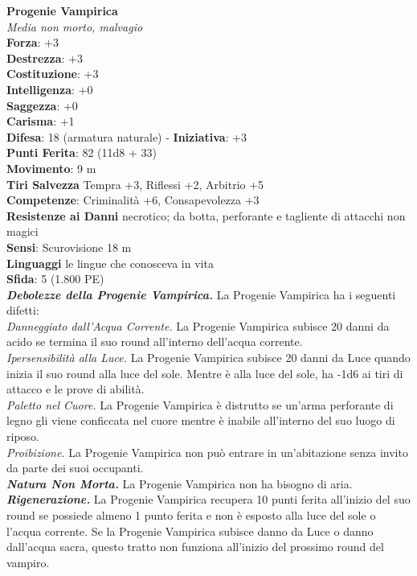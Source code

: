 \begin{multicols}{2}
\medskip\textbf{Progenie Vampirica}\\
\emph{Media non morto, malvagio}\\
\textbf{Forza}: +3\\
\textbf{Destrezza}: +3\\
\textbf{Costituzione}: +3\\
\textbf{Intelligenza}: +0\\
\textbf{Saggezza}: +0\\
\textbf{Carisma}: +1\\
\textbf{Difesa}: 18 (armatura naturale) - \textbf{Iniziativa}: +3\\
\textbf{Punti Ferita}: 82 (11d8 + 33)\\
\textbf{Movimento}: 9 m\\
\textbf{Tiri Salvezza} Tempra +3, Riflessi +2, Arbitrio +5\\
\textbf{Competenze}: Criminalità +6, Consapevolezza +3\\
\textbf{Resistenze ai Danni} necrotico; da botta, perforante e tagliente di attacchi non magici\\
\textbf{Sensi}: Scurovisione 18 m \\
\textbf{Linguaggi} le lingue che conosceva in vita\\
\textbf{Sfida}: 5 (1.800 PE)\smallskip\\
\emph{\textbf{Debolezze della Progenie Vampirica.}} La Progenie Vampirica ha i seguenti difetti:\\
\emph{Danneggiato dall'Acqua Corrente.} La Progenie Vampirica subisce 20 danni da acido se termina il suo round all'interno dell'acqua corrente.\\
\emph{Ipersensibilità alla Luce.} La Progenie Vampirica subisce 20 danni da Luce quando inizia il suo round alla luce del sole. Mentre è alla luce del sole, ha -1d6 ai tiri di attacco e le prove di abilità.\\
\emph{Paletto nel Cuore.} La Progenie Vampirica è distrutto se un'arma perforante di legno gli viene conficcata nel cuore mentre è inabile all'interno del suo luogo di riposo.\\
\emph{Proibizione.} La Progenie Vampirica non può entrare in un'abitazione senza invito da parte dei suoi occupanti.\\
\emph{\textbf{Natura Non Morta.}} La Progenie Vampirica non ha bisogno di aria.\\

\emph{\textbf{Rigenerazione.}} La Progenie Vampirica recupera 10 punti ferita all'inizio del suo round se possiede almeno 1 punto ferita e non è esposto alla luce del sole o l'acqua corrente. Se la Progenie Vampirica subisce danno da Luce o danno dall'acqua sacra, questo tratto non funziona all'inizio del prossimo round del vampiro.\\


\end{multicols}
